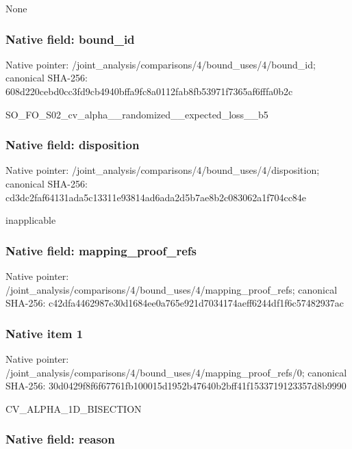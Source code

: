 \documentclass[10pt,a4paper]{article}
\begin{document}
None


\subsubsection{Native field: bound\_id}


Native pointer: /joint\_analysis/comparis\allowbreak{}ons/4/bound\_uses/4/bound\allowbreak{}\_id; canonical SHA-256: 608d220cebd0cc3fd9cb4940\allowbreak{}bffa9fc8a0112fab8fb53971\allowbreak{}f7365af6fffa0b2c


SO\_FO\_S02\_cv\_alpha\_\_rand\allowbreak{}omized\_\_expected\_loss\_\_b\allowbreak{}5


\subsubsection{Native field: disposition}


Native pointer: /joint\_analysis/comparis\allowbreak{}ons/4/bound\_uses/4/dispo\allowbreak{}sition; canonical SHA-256: cd3dc2faf64131ada5c13311\allowbreak{}e93814ad6ada2d5b7ae8b2c0\allowbreak{}83062a1f704cc84e


inapplicable


\subsubsection{Native field: mapping\_proof\_refs}


Native pointer: /joint\_analysis/comparis\allowbreak{}ons/4/bound\_uses/4/mappi\allowbreak{}ng\_proof\_refs; canonical SHA-256: c42dfa4462987e30d1684ee0\allowbreak{}a765e921d7034174aeff6244\allowbreak{}df1f6c57482937ac



\subsubsection{Native item 1}


Native pointer: /joint\_analysis/comparis\allowbreak{}ons/4/bound\_uses/4/mappi\allowbreak{}ng\_proof\_refs/0; canonical SHA-256: 30d0429f8f6f67761fb10001\allowbreak{}5d1952b47640b2bff41f1533\allowbreak{}719123357d8b9990


CV\_ALPHA\_1D\_BISECTION


\subsubsection{Native field: reason}
\end{document}
